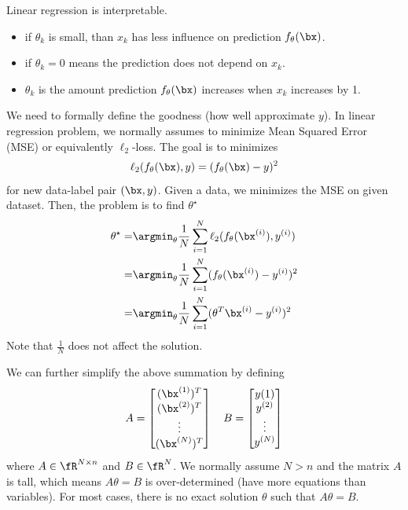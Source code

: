 \documentclass{article}
\begin{document}
Linear regression is interpretable.
\begin{itemize}
    \item if $\theta_k$ is small, than $x_k$ has less influence on prediction $f_\theta(\bx)$.
    \item if $\theta_k=0$ means the prediction does not depend on $x_k$.
    \item $\theta_k$ is the amount prediction $f_\theta(\bx)$ increases when $x_k$ increases by 1.
\end{itemize}

We need to formally define the goodness (how well approximate $y$).
In linear regression problem, we normally assumes to minimize Mean Squared Error (MSE) or equivalently $\ell_2$-loss.
The goal is to minimizes
\begin{align}
    \ell_2(f_\theta(\bx), y) = (f_\theta(\bx)-y)^2
\end{align}
for new data-label pair $(\bx, y)$.
Given a data, we minimizes the MSE on given dataset.
Then, the problem is to find $\theta^\star$
\begin{align}
    \theta^\star 
    =& \argmin_\theta \frac{1}{N} \sum_{i=1}^N \ell_2(f_\theta(\bx^{(i)}) , y^{(i)})\\
    =& \argmin_\theta \frac{1}{N} \sum_{i=1}^N (f_\theta(\bx^{(i)}) - y^{(i)})^2\\
    =& \argmin_\theta \frac{1}{N} \sum_{i=1}^N (\theta^T\bx^{(i)} - y^{(i)})^2
\end{align}
Note that $\frac{1}{N}$ does not affect the solution.

We can further simplify the above summation by defining
\begin{align}
    A = \begin{bmatrix}
        (\bx^{(1)})^T\\
        (\bx^{(2)})^T\\
        \vdots\\
        (\bx^{(N)})^T\\
    \end{bmatrix}\quad 
    B = \begin{bmatrix}y{(1)}\\y^{(2)}\\\vdots\\y^{(N)}\end{bmatrix}
\end{align}
where $A\in\fR^{N\times n}$ and $B\in\fR^N$.
We normally assume $N > n$ and the matrix $A$ is tall, which means $A\theta = B$ is over-determined (have more equations than variables).
For most cases, there is no exact solution $\theta$ such that $A\theta=B$.
\end{document}
